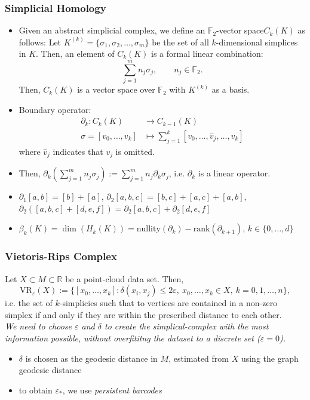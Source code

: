 \documentclass{article}
\newcommand{\R}{\mathbb{R}}
\begin{document}
\subsubsection*{Simplicial Homology}
\begin{itemize}
	\item Given an abstract simplicial complex, we define an $\mathbb F_2$-vector space$C_k(K)$ as follows: Let $K^{(k)} = \{ \sigma_1, \sigma_2, \dots, \sigma_m \}$ be the set of all $k$-dimensional simplices in $K$. Then, an element of $C_k(K)$ is a formal linear combination: $$\sum_{j=1}^m n_j \sigma_j, \qquad n_j \in \mathbb F_2.$$ Then, $C_k(K)$ is a vector space over $\mathbb F_2$ with $K^{(k)}$ as a basis.
	\item Boundary operator: 
		\begin{align*}
			\partial_k : C_k(K) & \to C_{k-1}(K) \\
			\sigma = [v_0, \dots, v_k] & \mapsto \sum_{j=1}^k [v_0, \dots, \hat v_j, \dots, v_k]
		\end{align*}
		where $\hat v_j$ indicates that $v_j$ is omitted.
	\item Then, $\partial_k \left( \sum_{j=1}^m n_j \sigma_j \right) := \sum_{j=1}^m n_j \partial_k \sigma_j$, i.e. $\partial_k$ is a linear operator.
	\item $\partial_1[a, b] = [b] + [a]$, $\partial_2[a, b, c] = [b, c] + [a, c] + [a, b]$, $\partial_2([a, b, c] + [d, e, f]) = \partial_2[a, b, c] + \partial_2[d, e, f]$
	\item $\beta_k(K) = \dim(H_k(K)) = \text{nullity}(\partial_k) - \text{rank}(\partial_{k+1})$, $k \in \{ 0, \dots, d \}$
\end{itemize}

\subsubsection*{Vietoris-Rips Complex}
Let $X \subset M \subset \R$ be a point-cloud data set. Then, 
$$\text{VR}_\varepsilon(X) := \{ [x_0, \dots, x_k] : \delta(x_i, x_j) \leq 2\varepsilon, \ x_0, \dots, x_k \in X, \ k = 0, 1, \dots, n \},$$
i.e. the set of $k$-simplicies such that to vertices are contained in a non-zero simplex if and only if they are within the prescribed distance to each other. \\
\textit{We need to choose $\varepsilon$ and $\delta$ to create the simplical-complex with the most information possible, without overfititng the dataset to a discrete set ($\varepsilon = 0$).}
\begin{itemize}
	\item $\delta$ is chosen as the geodesic distance in $M$, estimated from $X$ using the graph geodesic distance
	\item to obtain $\varepsilon_*$, we use \textit{persistent barcodes}
\end{itemize}
\end{document}
